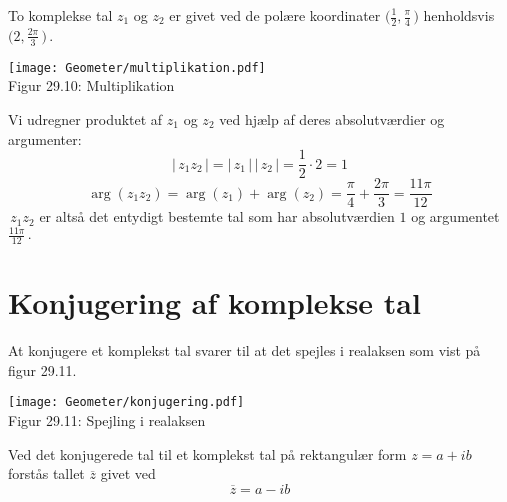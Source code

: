 \begin{example}\label{PolarMult}
To komplekse tal $z_1$ og $z_2$ er givet ved de polære koordinater $\big(\frac 12,\frac{\pi}4\,\big)$ henholdsvis $\big(2,\frac{2\pi}3\,\big)\,$.
\begin{center}
	\texttt{[image: Geometer/multiplikation.pdf]}\\
Figur 29.10: Multiplikation 
\end{center}
 Vi udregner produktet af $z_1$ og $z_2$ ved hjælp af deres absolutværdier og argumenter:
$$|\,z_1z_2\,|=|\,z_1\,|\,|\,z_2\,|=\frac12\cdot2=1$$
$$\arg(z_1z_2)=\arg(z_1)+\arg(z_2)=\frac{\pi}{4}+\frac{2\pi}{3}=\frac{11\pi}{12}$$
$\,z_1z_2$ er altså det entydigt bestemte tal som har absolutværdien $1$ og argumentet $\frac{11\pi}{12}\,.$
\end{example}
 
\section{Konjugering af komplekse tal}

At konjugere et komplekst tal svarer til at det spejles i realaksen som vist på figur 29.11.
\begin{center}
	\texttt{[image: Geometer/konjugering.pdf]}\\
Figur 29.11: Spejling i realaksen 
\end{center}

\begin{definition}
Ved det konjugerede tal til et komplekst tal på rektangulær form $z=a+ib$ forstås tallet $\overline z$ givet ved
\begin{equation}
\overline z=a-ib
\end{equation}
\end{definition}

